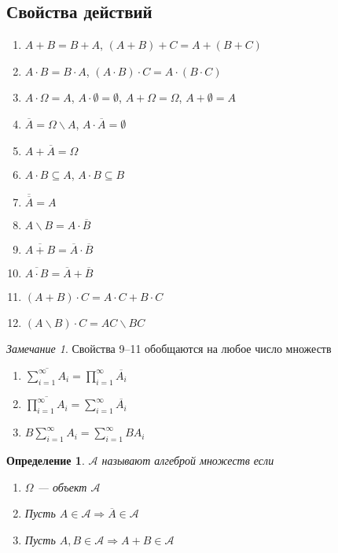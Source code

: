 \documentclass[10pt,a4paper,oneside,titlepage]{book}
\theoremstyle{plain}
\theoremstyle{defenition}
\newtheorem{defenition}{Определение}[section]
\theoremstyle{remark}
\newtheorem*{remark}{Замечание}
\begin{document}
\subsection{Свойства действий}

\begin{enumerate}
	\item $A+B=B+A$, $(A+B)+C=A+(B+C)$
	\item $A\cdot B=B\cdot A$, $(A\cdot B)\cdot C=A\cdot(B\cdot C)$
	\item $A\cdot\Omega=A$, $A\cdot\emptyset=\emptyset$, $A+\Omega=\Omega$, $A+\emptyset=A$
	\item $\overline{A}=\Omega\backslash A$, $A\cdot\overline{A}=\emptyset$
	\item $A+\overline{A}=\Omega$
	\item $A\cdot B\subseteq A$, $A\cdot B\subseteq B$
	\item $\overline{\overline{A}}=A$
	\item $A\backslash B=A\cdot\overline{B}$
	\item $\overline{A+B}=\overline{A}\cdot\overline{B}$
	\item $\overline{A\cdot B}=\overline{A}+\overline{B}$
	\item $(A+B)\cdot C=A\cdot C + B\cdot C$
	\item $(A\backslash B)\cdot C=AC\backslash BC$
\end{enumerate}

\begin{remark}
	Свойства 9--11 обобщаются на любое число множеств
	\begin{enumerate}\addtocounter{enumi}{8}
		\item $\overline{\sum\limits^{\infty}_{i=1}A_i}=\prod\limits_{i=1}^{\infty}\overline{A_i}$
		\item $\overline{\prod\limits_{i=1}^{\infty}A_i}=\sum\limits_{i=1}^{\infty}\overline{A_i}$
		\item $B\sum\limits_{i=1}^{\infty}A_i=\sum\limits_{i=1}^{\infty}BA_i$
	\end{enumerate}
\end{remark}

\begin{defenition}
	$\mathcal{A}$ называют алгеброй множеств если
	\begin{enumerate}
		\item $\Omega$ --- объект $\mathcal{A}$
		\item Пусть $A\in\mathcal{A}\Rightarrow\overline{A}\in\mathcal{A}$
		\item Пусть $A, B\in\mathcal{A}\Rightarrow A+B\in\mathcal{A}$
	\end{enumerate}
\end{defenition}
\end{document}
